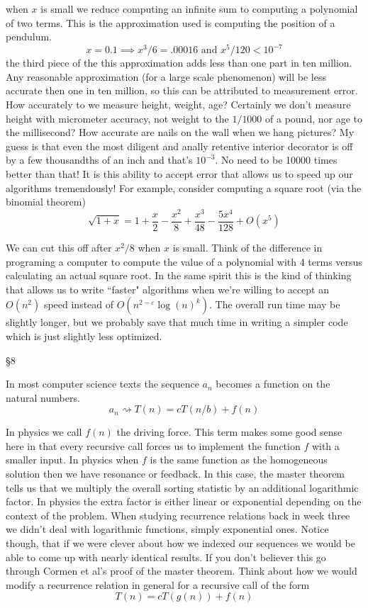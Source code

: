 \documentclass[16 pt]{amsart}
\theoremstyle{definition}
\theoremstyle{remark}
\numberwithin{equation}{subsection}
\begin{document}
when $x$ is small we reduce computing an infinite sum to computing a polynomial of two terms.  This is the approximation used is computing the position of a pendulum. 
\[
x= 0.1 \implies x^3/6 = .00016 \text{ and } x^5/120 < 10^{-7}
\]
the third piece of the this approximation adds less than one part in ten million.  Any reasonable approximation (for a large scale phenomenon) will be less accurate then one in ten million, so this can be attributed to measurement error.  How accurately to we measure height, weight, age?  Certainly we don't measure height with micrometer accuracy, not weight to the $1/1000$ of a pound, nor age to the millisecond?  How accurate are nails on the wall when we hang pictures?  My guess is that even the most diligent and anally retentive interior decorator is off by a few thousandths of an inch and that's $10^{-3}$.  No need to be 10000 times better than that!  It is this ability to accept error that allows us to speed up our algorithms tremendously!  For example, consider computing a square root (via the binomial theorem)
\[
\sqrt{1+x} = 1 + \frac{x}{2} - \frac{x^2}{8} + \frac{x^3}{48} - \frac{5x^4}{128} + O(x^5)
\]

We can cut this off after $x^2/8$ when $x$ is small.  Think of the difference in programing a computer to compute the value of a polynomial with 4 terms versus calculating an actual square root.  In the same spirit this is the kind of thinking that allows us to write ``faster" algorithms when we're willing to accept an $O(n^2)$ speed instead of
$O(n^{2-\varepsilon}\log(n)^k)$.  The overall run time may be slightly longer, but we probably save that much time in writing a simpler code which is just slightly less optimized. 

\S8

In most computer science texts the sequence $a_n$ becomes a function on the natural numbers.
\[
a_n \rightsquigarrow T(n) = cT(n/b)+f(n)
\]

In physics we call $f(n)$ the driving force.  This term makes some good sense here in that every recursive call forces us to implement the function $f$ with a smaller input.  In physics when $f$ is the same function as the homogeneous solution then we have resonance or feedback.  In this case, the master theorem tells us that we multiply the overall sorting statistic by an additional logarithmic factor.  In physics the extra factor is either linear or exponential depending on the context of the problem.  When studying recurrence relations back in week three we didn't deal with logarithmic functions, simply exponential ones.  Notice though, that if we were clever about how we indexed our sequences we would be able to come up with nearly identical results.  If you don't believer this go through Cormen et al's proof of the master theorem.  Think about how we would modify a recurrence relation in general for a recursive call of the form
\[
T(n) = cT(g(n))+ f(n) 
\] 
\end{document}
